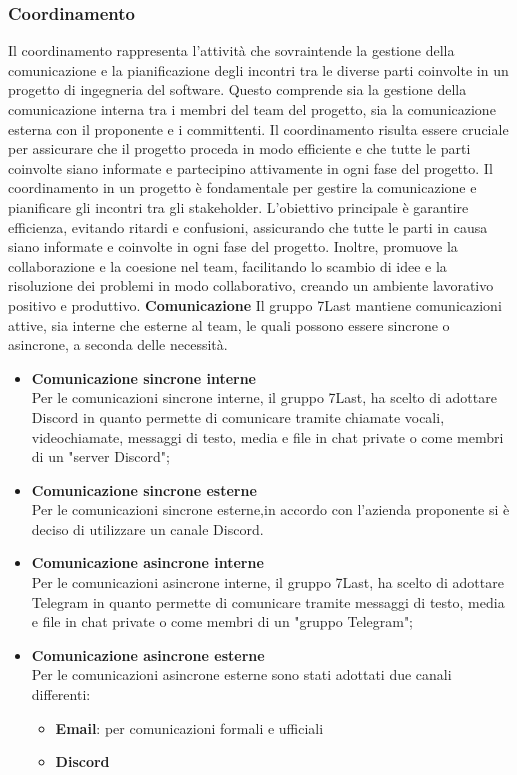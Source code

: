 \subsubsection{Coordinamento}
Il coordinamento rappresenta l’attività che sovraintende la gestione della comunicazione e la pianificazione degli incontri tra le diverse parti coinvolte in un progetto di ingegneria del software. Questo comprende sia la gestione della comunicazione interna tra i membri del team del progetto, sia la comunicazione esterna con il proponente e i committenti. Il coordinamento risulta essere cruciale per assicurare che il progetto proceda in modo efficiente e che tutte le parti coinvolte siano informate e partecipino attivamente in ogni fase del progetto.
Il coordinamento in un progetto è fondamentale per gestire la comunicazione e pianificare gli incontri tra gli stakeholder. L’obiettivo principale è garantire efficienza, evitando ritardi e confusioni, assicurando che tutte le parti in causa siano informate e coinvolte in ogni fase del progetto. Inoltre, promuove la collaborazione e la coesione nel team, facilitando lo scambio di idee e la risoluzione dei problemi in modo collaborativo, creando un ambiente lavorativo positivo e produttivo.
\textbf{Comunicazione}
Il gruppo 7Last mantiene comunicazioni attive, sia interne che esterne al team, le quali possono essere sincrone o asincrone, a seconda delle necessità.
\begin{itemize}
    \item \textbf{Comunicazione sincrone interne}\\Per le comunicazioni sincrone interne, il gruppo 7Last, ha scelto di adottare Discord in quanto permette di comunicare tramite chiamate vocali, videochiamate, messaggi di testo, media e file in chat private o come membri di un "server Discord";
    \item \textbf{Comunicazione sincrone esterne}\\Per le comunicazioni sincrone esterne,in accordo con l’azienda proponente si è deciso di utilizzare un canale Discord.
\end{itemize}
\begin{itemize}
    \item \textbf{Comunicazione asincrone interne}\\Per le comunicazioni asincrone interne, il gruppo 7Last, ha scelto di adottare Telegram in quanto permette di comunicare tramite messaggi di testo, media e file in chat private o come membri di un "gruppo Telegram";
    \item \textbf{Comunicazione asincrone esterne}\\Per le comunicazioni asincrone esterne sono stati adottati due canali differenti:
        \begin{itemize}
            \item \textbf{Email}: per comunicazioni formali e ufficiali
            \item \textbf{Discord}
        \end{itemize}
\end{itemize}
